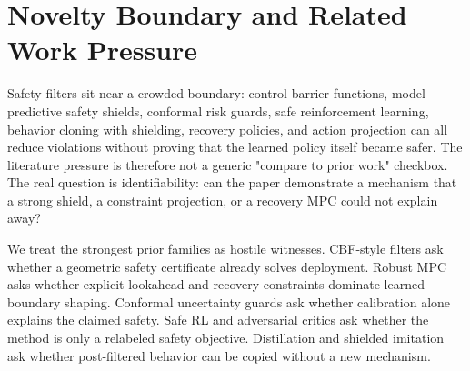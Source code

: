 \documentclass{article}
\begin{document}
\section{Novelty Boundary and Related Work Pressure}
Safety filters sit near a crowded boundary: control barrier functions, model predictive safety shields, conformal risk guards, safe reinforcement learning, behavior cloning with shielding, recovery policies, and action projection can all reduce violations without proving that the learned policy itself became safer. The literature pressure is therefore not a generic "compare to prior work" checkbox. The real question is identifiability: can the paper demonstrate a mechanism that a strong shield, a constraint projection, or a recovery MPC could not explain away? \citep{r101109robot20095152268,r101109robot20105509492,r101109robot20084543529,r101109robot2007363140,r10111514001666,r101016jins2024121567} \citep{r101016jisatra202504024,r101109lra20223174363,r101523jneurosci2125202021,r101016jbirob2024100173,r101109access20213105587,r260525546v1} \citep{r260602562v1,r1048550arxiv230112012,r101002rob20396,r101609aaaiv33i0133013387,r260320985v1,r221202941v3} \citep{r101146annurevcontrol042920020211,r103389fnbot20251697518,r101109tim20233239925,r260411174v1,r1052200011958000003479,r1048550arxiv231003693}

We treat the strongest prior families as hostile witnesses. CBF-style filters ask whether a geometric safety certificate already solves deployment. Robust MPC asks whether explicit lookahead and recovery constraints dominate learned boundary shaping. Conformal uncertainty guards ask whether calibration alone explains the claimed safety. Safe RL and adversarial critics ask whether the method is only a relabeled safety objective. Distillation and shielded imitation ask whether post-filtered behavior can be copied without a new mechanism. \citep{r1062311nesxrb9788199892378,r101109tcst20233243403,r101109icra20146907768,r10111514030273,r103390robotics14080108,r101109icrom20136510089} \citep{r101523jneurosci5792112012,r101001amajethics2023615,r103390math14030516,r102139ssrn6876397,r101109lra20223142907,r180800924v2} \citep{r230905837v1,r250220693v1,r101109lra20233284354,r103390robotics8010018,r101109roman1996568748,r101109tie20112162714} \citep{r103390buildings13030580,r241107833v2,r1031763ijrcsv5i42228,r1031763ijrcsv6i12312,r101299jsmermd20143a1h081,r1018280mmep090131} \citep{r101108ir1020200241,r250316960v1,r250315510v1,r250811129v1,r101109lcsys20233285616,r1011770278364911430420} \citep{r101016jjretconser2022103059,r103390s19173688,r102139ssrn6326519,r10108826318695ae4b0c,r1040189781799832386ch005,r1010881742659624491012012} \citep{r10114538057123809722,r101109mcs20233291885,r210208630v1,r101109med61351202410566197,r103390robotics15050095,r103390machines14060637} \citep{r240909868v2,r101152jn011292010,r101109tfuzz20233309706,r1056738issn29603986geo20267180,r101007s0014602101294x,r101109tro20223232542} \citep{r260424518v1,r101002rcs1773,r1048550arxiv220703830,r1010801936862320222112354,theimpactoftechnologicalchangeindairyfarmi,r200405273v2} \citep{r101007s10994021060191,r101115detc202291310,r101109tmech20152500602,r103390s25237335,r101109icra57147202410610418,r101115dscc20203253}
\end{document}
